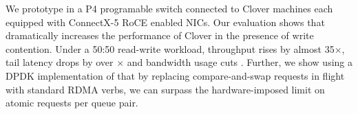 We prototype {\sword} in a P4 programable switch connected to Clover machines
each equipped with ConnectX-5 RoCE enabled NICs. Our evaluation shows that
{\sword} dramatically increases the performance of Clover in the presence of
write contention.  Under a 50:50 read-write workload, throughput rises by almost
35$\times$, tail latency drops by over $\times$ and bandwidth usage
cuts .  Further, we show using a DPDK implementation of
{\sword} that by replacing compare-and-swap requests in flight with standard RDMA
verbs, we can surpass the hardware-imposed limit on atomic requests per queue
pair.


